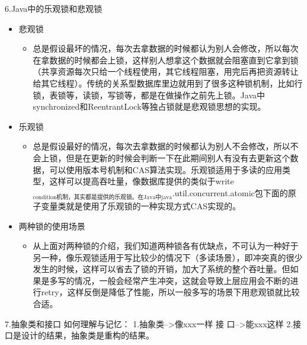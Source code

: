\documentclass[9pt, b5paper]{article}
\begin{document}
6.Java中的乐观锁和悲观锁
\begin{itemize}
\item 悲观锁
\begin{itemize}
\item 总是假设最坏的情况，每次去拿数据的时候都认为别人会修改，所以每次在拿数据的时候都会上锁，这样别人想拿这个数据就会阻塞直到它拿到锁（共享资源每次只给一个线程使用，其它线程阻塞，用完后再把资源转让给其它线程）。传统的关系型数据库里边就用到了很多这种锁机制，比如行锁，表锁等，读锁，写锁等，都是在做操作之前先上锁。Java中synchronized和ReentrantLock等独占锁就是悲观锁思想的实现。
\end{itemize}
\item 乐观锁
\begin{itemize}
\item 总是假设最好的情况，每次去拿数据的时候都认为别人不会修改，所以不会上锁，但是在更新的时候会判断一下在此期间别人有没有去更新这个数据，可以使用版本号机制和CAS算法实现。乐观锁适用于多读的应用类型，这样可以提高吞吐量，像数据库提供的类似于write$_{\text{condition机制，其实都是提供的乐观锁。在Java中java}}$.util.concurrent.atomic包下面的原子变量类就是使用了乐观锁的一种实现方式CAS实现的。
\end{itemize}
\item 两种锁的使用场景
\begin{itemize}
\item 从上面对两种锁的介绍，我们知道两种锁各有优缺点，不可认为一种好于另一种，像乐观锁适用于写比较少的情况下（多读场景），即冲突真的很少发生的时候，这样可以省去了锁的开销，加大了系统的整个吞吐量。但如果是多写的情况，一般会经常产生冲突，这就会导致上层应用会不断的进行retry，这样反倒是降低了性能，所以一般多写的场景下用悲观锁就比较合适。
\end{itemize}
\end{itemize}

7.抽象类和接口
如何理解与记忆：
1.抽象类-->像xxx一样
接 口-->能xxx这样
2.接口是设计的结果，抽象类是重构的结果。
\end{document}

